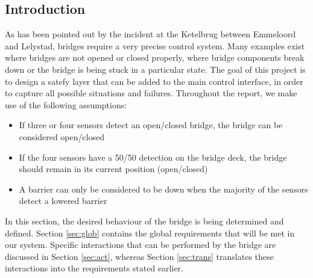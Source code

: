 \subsection{Introduction}

As has been pointed out by the incident at the Ketelbrug between Emmeloord and Lelystad, bridges require a very precise control system.  Many examples exist where bridges are not opened or closed properly, where bridge components break down or the bridge is being stuck in a particular state. The goal of this project is to design a satefy layer that can be added to the main control interface, in order to capture all possible situations and failures.
Throughout the report, we make use of the following assumptions:
%
\begin{itemize}
	\item If three or four sensors detect an open/closed bridge, the bridge can be considered open/closed
	\item If the four sensors	 have a 50/50 detection on the bridge deck, the bridge should remain in its current position (open/closed)
	\item A barrier can only be considered to be down when the majority of the sensors detect a lowered barrier
\end{itemize}
%
In this section, the desired behaviour of the bridge is being determined and defined. Section \ref{sec:glob} contains the global requirements that will be met in our system. Specific interactions that can be performed by the bridge are discussed in Section \ref{sec:act}, whereas Section \ref{sec:trans} translates these interactions into the requirements stated earlier.
